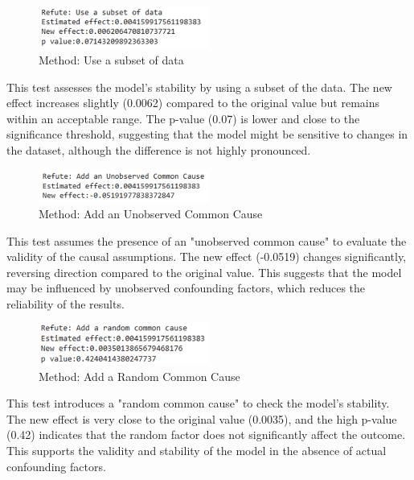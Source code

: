 \documentclass[12pt]{report}
\begin{document}
    \begin{figure}[h!]
        \centering
        \includegraphics[width=0.5\textwidth]{resources/pic/Testing Use a subset of data.png}
        \caption{Method: Use a subset of data}
        \label{fig:Use a subset of data}
    \end{figure}

    This test assesses the model's stability by using a subset of the data. The new effect increases slightly (0.0062) compared to the original value but remains within an acceptable range. The p-value (0.07) is lower and close to the significance threshold, suggesting that the model might be sensitive to changes in the dataset, although the difference is not highly pronounced.

    \begin{figure}[h!]
        \centering
        \includegraphics[width=0.5\textwidth]{resources/pic/Testing Add an Unobserved Common Cause.png}
        \caption{Method: Add an Unobserved Common Cause}
        \label{fig:Add an Unobserved Common Cause}
    \end{figure}

    This test assumes the presence of an "unobserved common cause" to evaluate the validity of the causal assumptions. The new effect (-0.0519) changes significantly, reversing direction compared to the original value. This suggests that the model may be influenced by unobserved confounding factors, which reduces the reliability of the results.

    \begin{figure}[h!]
        \centering
        \includegraphics[width=0.5\textwidth]{resources/pic/Testing Add a Random Common Cause.png}
        \caption{Method: Add a Random Common Cause}
        \label{fig:Add a Random Common Cause}
    \end{figure}

    This test introduces a "random common cause" to check the model's stability. The new effect is very close to the original value (0.0035), and the high p-value (0.42) indicates that the random factor does not significantly affect the outcome. This supports the validity and stability of the model in the absence of actual confounding factors.
\end{document}
